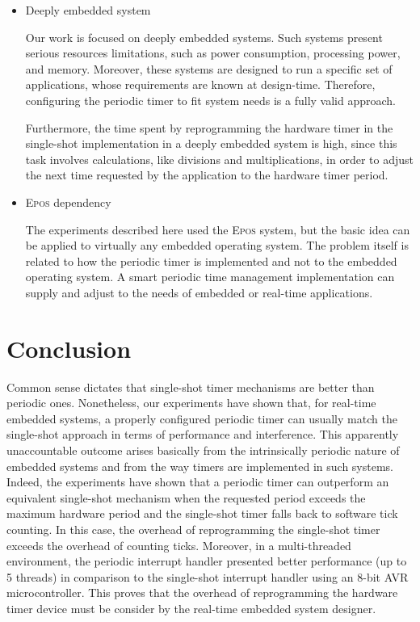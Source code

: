 \documentclass[final,3pd,times]{elsarticle}
\begin{document}
\begin{itemize}
\item Deeply embedded system

  Our work is focused on deeply embedded systems. Such systems present
  serious resources limitations, such as power consumption, processing
  power, and memory. Moreover, these systems are designed to run a
  specific set of applications, whose requirements are known at
  design-time. Therefore, configuring the periodic timer to fit system
  needs is a fully valid approach.

  Furthermore, the time spent by reprogramming the hardware timer in the
  single-shot implementation in a deeply embedded system is high, since
  this task involves calculations, like divisions and multiplications,
  in order to adjust the next time requested by the application to the
  hardware timer period.

\item \textsc{Epos} dependency

  The experiments described here used the \textsc{Epos} system, but the
  basic idea can be applied to virtually any embedded operating system.
  The problem itself is related to how the periodic timer is implemented
  and not to the embedded operating system. A smart periodic time
  management implementation can supply and adjust to the needs of
  embedded or real-time applications.

\end{itemize}

\section{Conclusion}\label{sec:con}

Common sense dictates that single-shot timer mechanisms are better than
periodic ones. Nonetheless, our experiments have shown that, for
real-time embedded systems, a properly configured periodic timer can
usually match the single-shot approach in terms of performance and
interference. This apparently unaccountable outcome arises basically
from the intrinsically periodic nature of embedded systems and from the
way timers are implemented in such systems. Indeed, the experiments have
shown that a periodic timer can outperform an equivalent single-shot
mechanism when the requested period exceeds the maximum hardware period
and the single-shot timer falls back to software tick counting. In this
case, the overhead of reprogramming the single-shot timer exceeds the
overhead of counting ticks. Moreover, in a multi-threaded environment,
the periodic interrupt handler presented better performance (up to 5
threads) in comparison to the single-shot interrupt handler using an
8-bit AVR microcontroller. This proves that the overhead of
reprogramming the hardware timer device must be consider by the
real-time embedded system designer.
\end{document}
